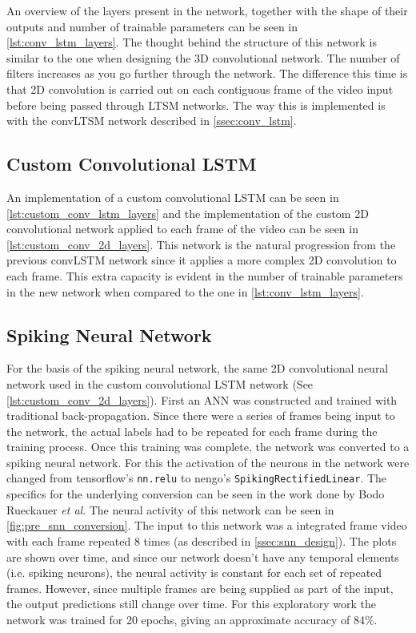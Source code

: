 An overview of the layers present in the network, together with the shape of their outputs and number of trainable parameters can be seen in \cref{lst:conv_lstm_layers}. The thought behind the structure of this network is similar to the one when designing the 3D convolutional network. The number of filters increases as you go further through the network. The difference this time is that 2D convolution is carried out on each contiguous frame of the video input before being passed through LTSM networks. The way this is implemented is with the convLTSM network described in \cref{ssec:conv_lstm}.

\subsection{Custom Convolutional LSTM}

An implementation of a custom convolutional LSTM can be seen in \cref{lst:custom_conv_lstm_layers} and the implementation of the custom 2D convolutional network applied to each frame of the video can be seen in \cref{lst:custom_conv_2d_layers}. This network is the natural progression from the previous convLSTM network since it applies a more complex 2D convolution to each frame. This extra capacity is evident in the number of trainable parameters in the new network when compared to the one in \cref{lst:conv_lstm_layers}.

\subsection{Spiking Neural Network}

For the basis of the spiking neural network, the same 2D convolutional neural network used in the custom convolutional LSTM network (See \cref{lst:custom_conv_2d_layers}). First an ANN was constructed and trained with traditional back-propagation. Since there were a series of frames being input to the network, the actual labels had to be repeated for each frame during the training process. Once this training was complete, the network was converted to a spiking neural network. For this the activation of the neurons in the network were changed from tensorflow's \lstinline{nn.relu} to nengo's \lstinline{SpikingRectifiedLinear}. The specifics for the underlying conversion can be seen in the work done by Bodo Rueckauer \textit{et al}\cite{Ann2Snn}. The neural activity of this network can be seen in \cref{fig:pre_snn_conversion}. The input to this network was a integrated frame video with each frame repeated 8 times (as described in \cref{ssec:snn_design}). The plots are shown over time, and since our network doesn't have any temporal elements (i.e. spiking neurons), the neural activity is constant for each set of repeated frames. However, since multiple frames are being supplied as part of the input, the output predictions still change over time. For this exploratory work the network was trained for 20 epochs, giving an approximate accuracy of 84\%.

